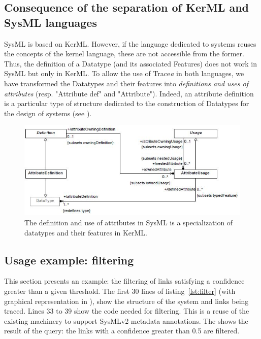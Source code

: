 \subsection{Consequence of the separation of KerML and SysML languages}\label{sec:lggsep}
SysML is based on KerML. However, if the language dedicated to systems reuses the concepts of the kernel language, these are not accessible from the former. Thus, the definition of a Datatype (and its associated Features) does not work in SysML but only in KerML. To allow the use of Trace\textit{a} in both languages, we have transformed the Datatypes and their features into \textit{definitions and uses of attributes} (resp. "Attribute def" and "Attribute"). Indeed, an attribute definition is a particular type of structure dedicated to the construction of Datatypes for the design of systems (see ).


\begin{figure}[h]     
	\centering
	\includegraphics[width=.9\linewidth]{images/dtnattributes.JPG}
	\caption{The definition and use of attributes in SysML is a specialization of datatypes and their features in KerML.}
	\label{fig:dtnattributes}
\end{figure} 

\subsection{Usage example: filtering}\label{sec:filter}
This section presents an example: the filtering of links satisfying a confidence greater than a given threshold.
The first 30 lines of listing~\ref{lst:filter} (with graphical representation in ), show the structure of the system and links being traced. Lines 33 to 39 show the code needed for filtering. This is a reuse of the existing machinery to support SysMLv2 metadata annotations. The  shows the result of the query: the links with a confidence greater than 0.5 are filtered.



